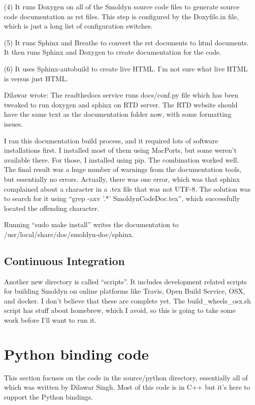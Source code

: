 \documentclass {scrbook}
\begin{document}
(4) It runs Doxygen on all of the Smoldyn source code files to generate source code documentation as rst files. This step is configured by the Doxyfile.in file, which is just a long list of configuration switches.

(5) It runs Sphinx and Breathe to convert the rst documents to html documents. It then runs Sphinx and Doxygen to create documentation for the code.

(6) It uses Sphinx-autobuild to create live HTML. I'm not sure what live HTML is versus just HTML.

Dilawar wrote: The readthedocs service runs docs/conf.py file which has been tweaked to run doxygen and sphinx on RTD server. The RTD website should have the same text as the documentation folder now, with some formatting issues. 

I ran this documentation build process, and it required lots of software installations first. I installed most of them using MacPorts, but some weren't available there. For those, I installed using pip. The combination worked well. The final result was a huge number of warnings from the documentation tools, but essentially no errors. Actually, there was one error, which was that sphinx complained about a character in a .tex file that was not UTF-8. The solution was to search for it using ``grep -axv '.*' SmoldynCodeDoc.tex'', which successfully located the offending character.

Running ``sudo make install'' writes the documentation to /usr/local/share/doc/smoldyn-doc/sphinx.


\section{Continuous Integration}

Another new directory is called ``scripts''. It includes development related scripts for building Smoldyn on online platforms like Travis, Open Build Service, OSX, and docker. I don't believe that these are complete yet. The build\_wheels\_osx.sh script has stuff about homebrew, which I avoid, so this is going to take some work before I'll want to run it.


\chapter{Python binding code}

This section focuses on the code in the source/python directory, essentially all of which was written by Dilawar Singh. Most of this code is in C++ but it's here to support the Python bindings.
\end{document}
